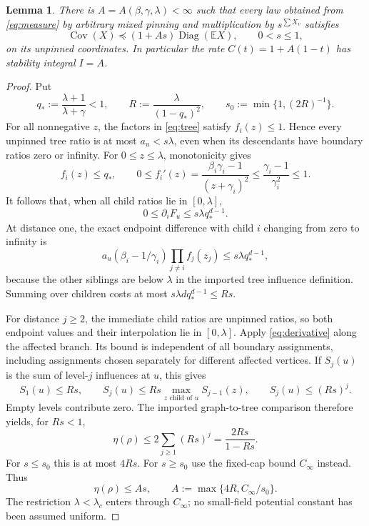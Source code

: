 \documentclass[11pt]{article}
\newtheorem{lemma}[theorem]{Lemma}
\theoremstyle{remark}\newtheorem{remark}[theorem]{Remark}
\newcommand{\Cov}{\operatorname{Cov}}
\newcommand{\diag}{\operatorname{Diag}}
\newcommand{\E}{\mathbb E}
\begin{document}
\begin{lemma}\label{lem:stability}
There is $A=A(\beta,\gamma,\lambda)<\infty$ such that every law obtained
from \eqref{eq:measure} by arbitrary mixed pinning and multiplication by
$s^{\sum X_v}$ satisfies
\[
 \Cov(X)\preceq(1+As)\diag(\E X),\qquad 0<s\leq1,
\]
on its unpinned coordinates. In particular the rate $C(t)=1+A(1-t)$
has stability integral $I=A$.
\end{lemma}
\begin{proof}
Put
\[
 q_*:=\frac{\lambda+1}{\lambda+\gamma}<1,\qquad
 R:=\frac{\lambda}{(1-q_*)^2},\qquad
 s_0:=\min\{1,(2R)^{-1}\}.
\]
For all nonnegative $z$, the factors in \eqref{eq:tree} satisfy
$f_i(z)\leq1$. Hence every unpinned tree ratio is at most $a_u<s\lambda$,
even when its descendants have boundary ratios zero or infinity.
For $0\leq z\leq\lambda$, monotonicity gives
\[
 f_i(z)\leq q_*,\qquad
 0\leq f_i'(z)=\frac{\beta_i\gamma_i-1}{(z+\gamma_i)^2}
 \leq\frac{\gamma_i-1}{\gamma_i^2}\leq1.
\]
It follows that, when all child ratios lie in $[0,\lambda]$,
\begin{equation}\label{eq:derivative}
 0\leq\partial_iF_u\leq s\lambda q_*^{d-1}.
\end{equation}
At distance one, the exact endpoint difference with child $i$ changing
from zero to infinity is
\[
 a_u(\beta_i-1/\gamma_i)\prod_{j\ne i}f_j(z_j)
 \leq s\lambda q_*^{d-1},
\]
because the other siblings are below $\lambda$ in the imported tree
influence definition. Summing over children costs at most
$s\lambda d q_*^{d-1}\leq Rs$.

For distance $j\geq2$, the immediate child ratios are unpinned ratios,
so both endpoint values and their interpolation lie in $[0,\lambda]$.
Apply \eqref{eq:derivative} along the affected branch. Its bound is
independent of all boundary assignments, including assignments chosen
separately for different affected vertices. If $S_j(u)$ is the sum of
level-$j$ influences at $u$, this gives
\[
 S_1(u)\leq Rs,\qquad
 S_j(u)\leq Rs\max_{z\text{ child of }u}S_{j-1}(z),
 \qquad S_j(u)\leq(Rs)^j.
\]
Empty levels contribute zero. The imported graph-to-tree comparison
therefore yields, for $Rs<1$,
\[
 \eta(\rho)\leq2\sum_{j\geq1}(Rs)^j
 =\frac{2Rs}{1-Rs}.
\]
For $s\leq s_0$ this is at most $4Rs$. For $s\geq s_0$ use the fixed-cap
bound $C_\infty$ instead. Thus
\begin{equation}\label{eq:eta}
 \eta(\rho)\leq As,\qquad
 A:=\max\{4R,C_\infty/s_0\}.
\end{equation}
The restriction $\lambda<\lambda_c$ enters through $C_\infty$;
no small-field potential constant has been assumed uniform.


\end{proof}
\end{document}
